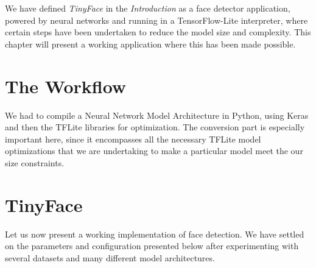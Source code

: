 We have defined \textit{TinyFace} in the \textit{Introduction} as a face detector application, powered by neural networks and running in a TensorFlow-Lite interpreter, where certain steps have been undertaken to reduce the model size and complexity. This chapter will present a working application where this has been made possible.
\section{The Workflow}
We had to compile a Neural Network Model Architecture in Python, using Keras and then the TFLite libraries for optimization. The conversion part is especially important here, since it encompasses all the necessary TFLite model optimizations that we are undertaking to make a particular model meet the our size constraints. \par

\section{TinyFace}
Let us now present a working implementation of face detection. We have settled on the parameters and configuration presented below after experimenting with several datasets and many different model architectures. 
